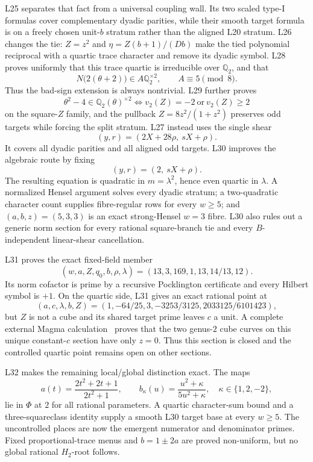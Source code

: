 \documentclass[11pt]{amsart}
\theoremstyle{definition}
\theoremstyle{remark}
\newcommand{\Q}{\mathbb{Q}}
\begin{document}
L25 separates that fact from a universal coupling wall.  Its two scaled
type-I formulas cover complementary dyadic parities, while their smooth
target formula is on a freely chosen unit-\(b\) stratum rather than the
aligned L20 stratum.  L26 changes the tie: \(Z=z^2\) and
\(\eta=Z(b+1)/(Db)\) make the tied polynomial reciprocal with a quartic
trace character and remove its dyadic symbol.  L28 proves uniformly
that this trace quartic is irreducible over \(\Q_2\), and that
\[
 N\bigl(2(\theta+2)\bigr)\in A\Q_2^{\times2},
 \qquad A\equiv5\pmod8.
\]
Thus the bad-sign extension is always nontrivial.  L29 further proves
\[
 \theta^2-4\in\Q_2(\theta)^{\times2}
 \iff v_2(Z)=-2\ \text{or}\ v_2(Z)\ge2
\]
on the square-\(Z\) family, and the pullback
\(Z=8z^2/(1+z^2)\) preserves odd targets while forcing the split
stratum.  L27 instead uses the single shear
\[
 (y,r)=(2X+28\rho,\ sX+\rho).
\]
It covers all dyadic parities and all aligned odd targets.  L30 improves
the algebraic route by fixing
\[
 (y,r)=(2,\ sX+\rho).
\]
The resulting equation is quadratic in \(m=\lambda^2\), hence even
quartic in \(\lambda\).  A normalized Hensel argument solves every
dyadic stratum; a two-quadratic character count supplies fibre-regular
rows for every \(w\ge5\); and \((a,b,z)=(5,3,3)\) is an exact
strong-Hensel \(w=3\) fibre.  L30 also rules out a generic norm section
for every rational square-branch tie and every \(B\)-independent
linear-shear cancellation.

L31 proves the exact fixed-field member
\[
 (w,a,Z,q_0,b,\rho,\lambda)
 =(13,3,169,1,13,14/13,12).
\]
Its norm cofactor is prime by a recursive Pocklington certificate and
every Hilbert symbol is \(+1\).  On the quartic side, L31 gives an exact
rational point at
\[
 (a,c,\lambda,b,Z)=
 (1,-64/25,3,-3253/3125,2033125/6101423),
\]
but \(Z\) is not a cube and its shared target prime leaves \(c\) a
unit.  A complete external Magma calculation~\cite{magma} proves that the two
genus-\(2\) cube curves on this unique constant-\(c\) section have only
\(z=0\).  Thus this section is closed and the controlled quartic point
remains open on other sections.

L32 makes the remaining local/global distinction exact.  The maps
\[
a(t)=\frac{2t^2+2t+1}{2t^2+1},\qquad
b_\kappa(u)=\frac{u^2+\kappa}{5u^2+\kappa},
\quad\kappa\in\{1,2,-2\},
\]
lie in \(\Phi\) at \(2\) for all rational parameters.  A quartic
character-sum bound and a three-squareclass identity supply a smooth
L30 target base at every \(w\ge5\).  The uncontrolled places are now
the emergent numerator and denominator primes.  Fixed proportional-trace
menus and \(b=1\pm2a\) are proved non-uniform, but no global rational
\(H_2\)-root follows.
\end{document}

